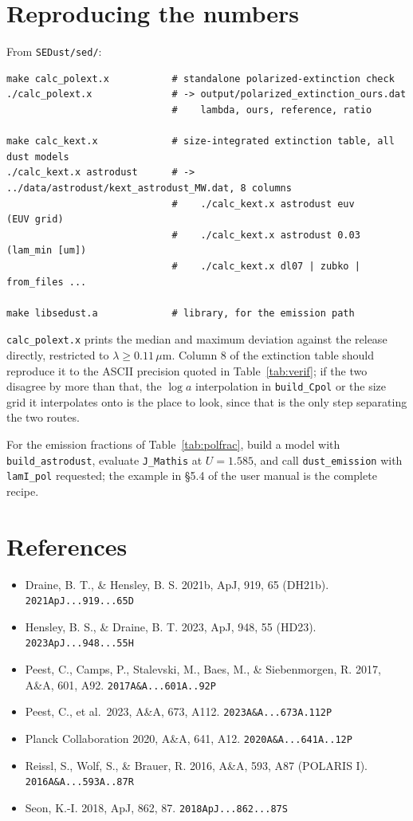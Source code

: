 \documentclass{my_memo}
\newcommand{\code}[1]{\texttt{#1}}
\newcommand{\um}{\ensuremath{\,\mu\mathrm{m}}}
\begin{document}
\section{Reproducing the numbers}

From \code{SEDust/sed/}:
\begin{lstlisting}[style=sh]
make calc_polext.x           # standalone polarized-extinction check
./calc_polext.x              # -> output/polarized_extinction_ours.dat
                             #    lambda, ours, reference, ratio

make calc_kext.x             # size-integrated extinction table, all dust models
./calc_kext.x astrodust      # -> ../data/astrodust/kext_astrodust_MW.dat, 8 columns
                             #    ./calc_kext.x astrodust euv       (EUV grid)
                             #    ./calc_kext.x astrodust 0.03      (lam_min [um])
                             #    ./calc_kext.x dl07 | zubko | from_files ...

make libsedust.a             # library, for the emission path
\end{lstlisting}

\code{calc\_polext.x} prints the median and maximum deviation against the
release directly, restricted to $\lambda \ge 0.11\um$. Column 8 of the
extinction table should reproduce it to the ASCII precision quoted in
Table~\ref{tab:verif}; if the two disagree by more than that, the $\log a$
interpolation in \code{build\_Cpol} or the size grid it interpolates onto is
the place to look, since that is the only step separating the two routes.

For the emission fractions of Table~\ref{tab:polfrac}, build a model with
\code{build\_astrodust}, evaluate \code{J\_Mathis} at $U = 1.585$, and call
\code{dust\_emission} with \code{lamI\_pol} requested; the example in \S5.4 of
the user manual is the complete recipe.

\section{References}

\begin{itemize}
\item Draine, B. T., \& Hensley, B. S. 2021b, ApJ, 919, 65 (DH21b).
      \code{2021ApJ...919...65D}
\item Hensley, B. S., \& Draine, B. T. 2023, ApJ, 948, 55 (HD23).
      \code{2023ApJ...948...55H}
\item Peest, C., Camps, P., Stalevski, M., Baes, M., \& Siebenmorgen, R.
      2017, A\&A, 601, A92.
      \code{2017A\&A...601A..92P}
\item Peest, C., et al.\ 2023, A\&A, 673, A112.
      \code{2023A\&A...673A.112P}
\item Planck Collaboration 2020, A\&A, 641, A12.
      \code{2020A\&A...641A..12P}
\item Reissl, S., Wolf, S., \& Brauer, R. 2016, A\&A, 593, A87 (POLARIS I).
      \code{2016A\&A...593A..87R}
\item Seon, K.-I. 2018, ApJ, 862, 87.
      \code{2018ApJ...862...87S}
\end{itemize}
\end{document}

